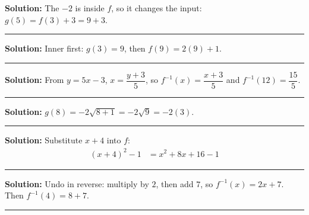 \documentclass[12pt]{article}
\begin{document}



\textbf{Solution:} The $-2$ is inside $f$, so it changes the input: $g(5) = f(3) + 3 = 9 + 3$. 

\vspace{0.1cm}\noindent\rule{\linewidth}{0.2pt}


\textbf{Solution:} Inner first: $g(3) = 9$, then $f(9) = 2(9) + 1$. 

\vspace{0.1cm}\noindent\rule{\linewidth}{0.2pt}


\textbf{Solution:} From $y = 5x - 3$, $x = \dfrac{y+3}{5}$, so $f^{-1}(x) = \dfrac{x+3}{5}$ and $f^{-1}(12) = \dfrac{15}{5}$. 

\vspace{0.1cm}\noindent\rule{\linewidth}{0.2pt}


\textbf{Solution:} $g(8) = -2\sqrt{8 + 1} = -2\sqrt{9} = -2(3)$. 

\vspace{0.1cm}\noindent\rule{\linewidth}{0.2pt}


\textbf{Solution:} Substitute $x + 4$ into $f$:
\begin{align*}
  (x + 4)^{2} - 1 &= x^{2} + 8x + 16 - 1
\end{align*}

\vspace{0.1cm}\noindent\rule{\linewidth}{0.2pt}


\textbf{Solution:} Undo in reverse: multiply by $2$, then add $7$, so $f^{-1}(x) = 2x + 7$. Then $f^{-1}(4) = 8 + 7$. 

\vspace{0.1cm}\noindent\rule{\linewidth}{0.2pt}
\end{document}
